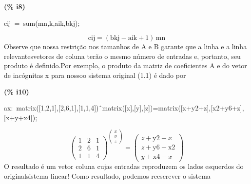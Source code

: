 \documentclass[fleqn]{article}
\begin{document}
\noindent
\begin{minipage}[t]{4.000000em}\color{red}\bfseries
(\% i8)	
\end{minipage}
\begin{minipage}[t]{\textwidth}\color{blue}
cij\ =\ sum(mn,k,aik,bkj);
\end{minipage}
\[\displaystyle \tag{\% o8} 
\ensuremath{\mathrm{cij}}\mathop{=}\left( \ensuremath{\mathrm{bkj}}\mathop{-}\ensuremath{\mathrm{aik}}\mathop{+}1\right) \, \ensuremath{\mathrm{mn}}\mbox{}
\]
Observe que nossa restrição nos tamanhos de A e B garante que a linha e a linha relevantesvetores de coluna terão o mesmo número de entradas e, portanto, seu produto é definido.Por exemplo, o produto da matriz de coeficientes A e do vetor de incógnitas x para nossoo sistema original (1.1) é dado por


\noindent
\begin{minipage}[t]{4.000000em}\color{red}\bfseries
(\% i10)	
\end{minipage}
\begin{minipage}[t]{\textwidth}\color{blue}
ax:\ matrix([1,2,1],[2,6,1],[1,1,4])\^\ matrix([x],[y],[z])=matrix([x+y2+z],[x2+y6+z],[x+y+x4]);
\end{minipage}
\[\displaystyle \tag{ax} 
{{\begin{pmatrix}1 & 2 & 1\\
2 & 6 & 1\\
1 & 1 & 4\end{pmatrix}}^{\begin{pmatrix}x\\
y\\
z\end{pmatrix}}}\mathop{=}\begin{pmatrix}z\mathop{+}\ensuremath{\mathrm{y2}}\mathop{+}x\\
z\mathop{+}\ensuremath{\mathrm{y6}}\mathop{+}\ensuremath{\mathrm{x2}}\\
y\mathop{+}\ensuremath{\mathrm{x4}}\mathop{+}x\end{pmatrix}\mbox{}
\]
O resultado é um vetor coluna cujas entradas reproduzem os lados esquerdos do originalsistema linear! Como resultado, podemos reescrever o sistema
\end{document}
